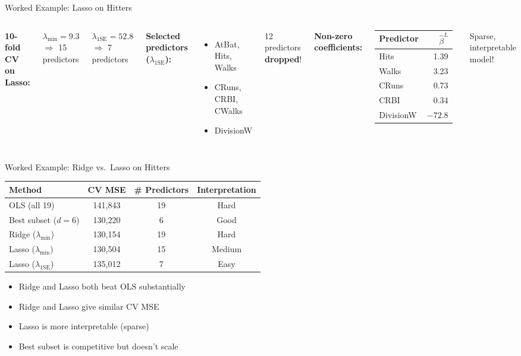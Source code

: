 \documentclass[aspectratio=169, 11pt]{beamer}
\begin{document}
\begin{frame}{Worked Example: Lasso on Hitters}
\begin{columns}
\textbf{10-fold CV on Lasso:}

$\lambda_{\min} = 9.3$ $\Rightarrow$ 15 predictors

$\lambda_{\text{1SE}} = 52.8$ $\Rightarrow$ 7 predictors

\vspace{0.3em}
\textbf{Selected predictors ($\lambda_{\text{1SE}}$):}
\begin{itemize}
  \item AtBat, Hits, Walks
  \item CRuns, CRBI, CWalks
  \item DivisionW
\end{itemize}

12 predictors \textbf{dropped}!

\textbf{Non-zero coefficients:}
\begin{tabular}{lr}
\toprule
Predictor & $\hat{\beta}^L$ \\
\midrule
Hits & 1.39 \\
Walks & 3.23 \\
CRuns & 0.73 \\
CRBI & 0.34 \\
DivisionW & $-72.8$ \\
\bottomrule
\end{tabular}
\vspace{0.3em}
\footnotesize Sparse, interpretable model!
\end{columns}
\end{frame}

\begin{frame}{Worked Example: Ridge vs.\ Lasso on Hitters}
\begin{center}
\begin{tabular}{lccc}
\toprule
Method & CV MSE & \# Predictors & Interpretation \\
\midrule
OLS (all 19) & 141,843 & 19 & Hard \\
Best subset ($d=6$) & 130,220 & 6 & Good \\
Ridge ($\lambda_{\min}$) & 130,154 & 19 & Hard \\
\textcolor{softgreen}{Lasso ($\lambda_{\min}$)} & \textcolor{softgreen}{130,504} & \textcolor{softgreen}{15} & Medium \\
\textcolor{softgreen}{Lasso ($\lambda_{\text{1SE}}$)} & 135,012 & \textcolor{softgreen}{7} & \textcolor{softgreen}{Easy} \\
\bottomrule
\end{tabular}
\end{center}
\vspace{0.3em}
\begin{itemize}
  \item Ridge and Lasso both beat OLS substantially
  \item Ridge and Lasso give similar CV MSE
  \item Lasso is more interpretable (sparse)
  \item Best subset is competitive but doesn't scale
\end{itemize}
\end{frame}
\end{document}
